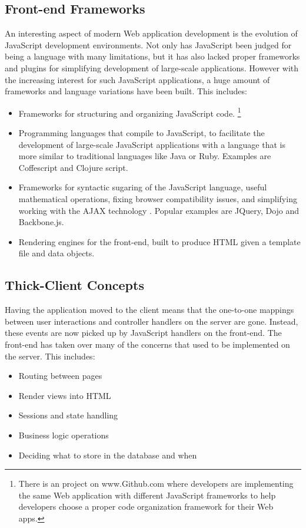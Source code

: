 \subsection{Front-end Frameworks}
An interesting aspect of modern Web application development is the evolution of JavaScript development environments. Not only has JavaScript been judged for being a language with many limitations, but it has also lacked proper frameworks and plugins for simplifying development of large-scale applications. However with the increasing interest for such JavaScript applications, a huge amount of frameworks and language variations have been built. This includes:
\begin{itemize}
\item{} Frameworks for structuring and organizing JavaScript code. \footnote{There is an project\cite{todo} on www.Github.com\cite{github} where developers are implementing the same Web application with different JavaScript frameworks to help developers choose a proper code organization framework for their Web apps.}
\item{} Programming languages that compile to JavaScript, to facilitate the development of large-scale JavaScript applications with a language that is more similar to traditional languages like Java or Ruby. Examples are Coffescript\cite{coffe} and Clojure script\cite{clojure}.
\item{} Frameworks for syntactic sugaring of the JavaScript language, useful mathematical operations, fixing browser compatibility issues, and simplifying working with the AJAX technology \cite{serrano2007ajax}. Popular examples are JQuery\cite{jquery}, Dojo\cite{dojo} and Backbone.js\cite{bakbone}.
\item{} Rendering engines for the front-end, built to produce HTML given a template file and data objects.
\end{itemize}

\subsection{Thick-Client Concepts}
Having the application moved to the client means that the one-to-one mappings between user interactions and controller handlers on the server are gone. Instead, these events are now picked up by JavaScript handlers on the front-end. The front-end has taken over many of the concerns that used to be implemented on the server. This includes: 
\begin{itemize}
\item{} Routing between pages
\item{} Render views into HTML
\item{} Sessions and state handling
\item{} Business logic operations
\item{} Deciding what to store in the database and when
\end{itemize}
 
